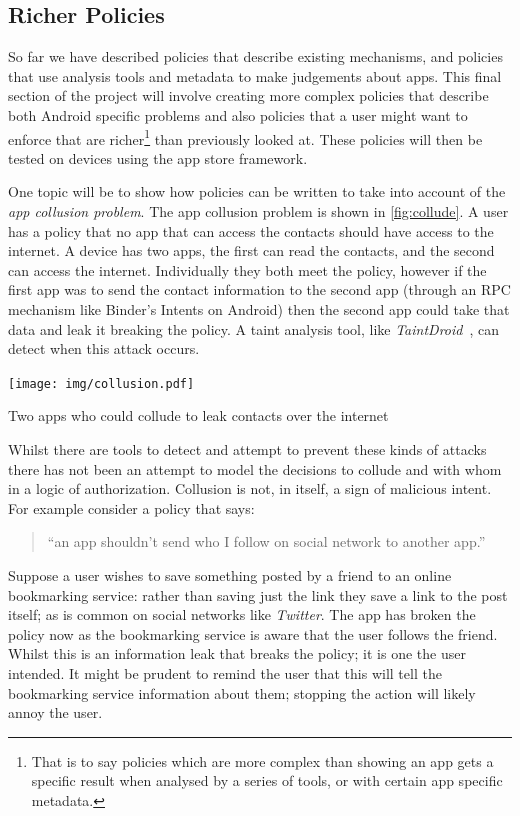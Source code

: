 \documentclass[a4paper,sfsidenotes]{%
  scrartcl%
}
\begin{document}
\subsection{Richer Policies}

So far we have described policies that describe existing mechanisms, and
policies that use analysis tools and metadata to make judgements about apps.
This final section of the project will involve creating more complex policies
that describe both Android specific problems and also policies that a user might
want to enforce that are richer\footnote{That is to say policies which are more
  complex than showing an app gets a specific result when analysed by a series
  of tools, or with certain app specific metadata.} than previously looked at.
These policies will then be tested on devices using the app store framework.

One topic will be to show how policies can be written to take into account of
the \emph{app collusion problem}.  The app collusion problem is shown in
\autoref{fig:collude}.  A user has a policy that no app that can access the
contacts should have access to the internet.  A device has two apps, the first
can read the contacts, and the second can access the internet.  Individually
they both meet the policy, however if the first app was to send the contact
information to the second app (through an \ac{RPC} mechanism like Binder's
Intents on Android) then the second app could take that data and leak it
breaking the policy.  A taint analysis tool, like
\emph{TaintDroid}~\cite{Enck:2010uw}, can detect when this attack occurs.

\begin{marginfigure}
  \texttt{[image: img/collusion.pdf]}
  \caption{Two apps who could collude to leak contacts over the internet}
  \label{fig:collude}
\end{marginfigure}

Whilst there are tools to detect and attempt to prevent these kinds of attacks
there has not been an attempt to model the decisions to collude and with whom in
a logic of authorization.  Collusion is not, in itself, a sign of malicious
intent.  For example consider a policy that says:
\begin{quote}
  ``an app shouldn't send who I follow on social network to another app.''
\end{quote}
Suppose a user wishes to save something posted by a friend to an online
bookmarking service: rather than saving just the link they save a link to the
post itself; as is common on social networks like \emph{Twitter}.  The app has
broken the policy now as the bookmarking service is aware that the user follows
the friend.  Whilst this is an information leak that breaks the policy; it is
one the user intended.  It might be prudent to remind the user that this will
tell the bookmarking service information about them; stopping the action
will likely annoy the user.
\end{document}
